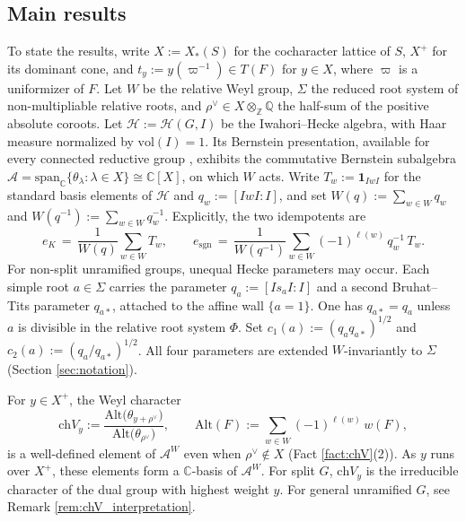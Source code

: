 \documentclass[12pt]{article}
\numberwithin{equation}{section}
\theoremstyle{definition}
\theoremstyle{remark}
\theoremstyle{plain}
\begin{document}
\subsection*{Main results}

To state the results, write $X := X_*(S)$ for the cocharacter lattice of $S$, $X^+$ for its dominant cone, and $t_y := y(\varpi^{-1}) \in T(F)$ for $y \in X$, where $\varpi$ is a uniformizer of $F$. Let $W$ be the relative Weyl group, $\Sigma$ the reduced root system of non-multipliable relative roots, and $\rho^\vee \in X \otimes_{\mathbb{Z}} \mathbb{Q}$ the half-sum of the positive absolute coroots. Let $\mathcal{H} := \mathcal{H}(G, I)$ be the Iwahori--Hecke algebra, with Haar measure normalized by $\mathrm{vol}(I) = 1$. Its Bernstein presentation, available for every connected reductive group \cite{Rostami}, exhibits the commutative Bernstein subalgebra $\mathcal{A} = \mathrm{span}_{\mathbb{C}}\{\theta_\lambda : \lambda \in X\} \cong \mathbb{C}[X]$, on which $W$ acts. Write $T_w := \mathbf{1}_{IwI}$ for the standard basis elements of $\mathcal{H}$ and $q_w := [IwI : I]$, and set $W(q) := \sum_{w \in W} q_w$ and $W(q^{-1}) := \sum_{w \in W} q_w^{-1}$. Explicitly, the two idempotents are
$$e_{K} \,=\, \frac{1}{W(q)}\sum_{w \in W} T_{w}, \qquad e_{\mathrm{sgn}} \,=\, \frac{1}{W(q^{-1})}\sum_{w \in W} (-1)^{\ell(w)}\,q_{w}^{-1}\, T_{w}.$$
For non-split unramified groups, unequal Hecke parameters may occur. Each simple root $a \in \Sigma$ carries the parameter $q_a := [I s_a I : I]$ and a second Bruhat--Tits parameter $q_{a*}$, attached to the affine wall $\{a = 1\}$. One has $q_{a*} = q_a$ unless $a$ is divisible in the relative root system $\Phi$. Set $c_1(a) := (q_a q_{a*})^{1/2}$ and $c_2(a) := (q_a/q_{a*})^{1/2}$. All four parameters are extended $W$-invariantly to $\Sigma$ (Section \ref{sec:notation}).

For $y \in X^+$, the Weyl character
\begin{equation*}
\mathrm{ch}V_y := \frac{\mathrm{Alt}\big(\theta_{y + \rho^\vee}\big)}{\mathrm{Alt}\big(\theta_{\rho^\vee}\big)}, \qquad \mathrm{Alt}(F) := \sum_{w \in W}(-1)^{\ell(w)}\, w(F),
\end{equation*}
is a well-defined element of $\mathcal{A}^W$ even when $\rho^\vee \notin X$ (Fact \ref{fact:chV}(2)). As $y$ runs over $X^+$, these elements form a $\mathbb{C}$-basis of $\mathcal{A}^W$. For split $G$, $\mathrm{ch}V_y$ is the irreducible character of the dual group with highest weight $y$. For general unramified $G$, see Remark \ref{rem:chV_interpretation}.
\end{document}
